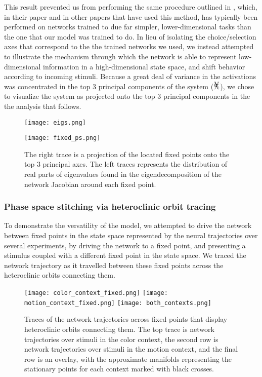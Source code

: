 \documentclass[12pt,a4paper,final]{iopart}
\begin{document}
This result prevented us from performing the same procedure outlined in \cite{BarakSussillo}, which, in their paper and in other papers that have used this method, has typically been performed on networks trained to due far simpler, lower-dimensional tasks than the one that our model was trained to do. In lieu of isolating the choice/selection axes that correspond to the the trained networks we used, we instead attempted to illustrate the mechanism through which the network is able to represent low-dimensional information in a high-dimensional state space, and shift behavior according to incoming stimuli. Because a great deal of variance in the activations was concentrated in the top $3$ principal components of the system ($\mathaccent89\%$), we chose to visualize the system as projected onto the top $3$ principal components in the the analysis that follows.

\begin{figure}
    \centering
    \begin{minipage}{0.49\linewidth}
        \centering
        \texttt{[image: eigs.png]}
    \end{minipage}
    \begin{minipage}{0.49\linewidth}
        \centering
        \texttt{[image: fixed\_ps.png]}
    \end{minipage}
    \caption{The right trace is a projection of the located fixed points onto the top $3$ principal axes. The left traces represents the distribution of real parts of eigenvalues found in the eigendecomposition of the network Jacobian around each fixed point.}
    \label{fig:my_label}
\end{figure}

\subsubsection{Phase space stitching via heteroclinic orbit tracing}
To demonstrate the versatility of the model, we attempted to drive the network between fixed points in the state space represented by the neural trajectories over several experiments, by driving the network to a fixed point, and presenting a stimulus coupled with a different fixed point in the state space. We traced the network trajectory as it travelled between these fixed points across the heteroclinic orbits connecting them.

\begin{figure}
    \centering
    \texttt{[image: color\_context\_fixed.png]}
    \texttt{[image: motion\_context\_fixed.png]}
    \texttt{[image: both\_contexts.png]}
    \caption{Traces of the network trajectories across fixed points that display heteroclinic orbits connecting them. The top trace is network trajectories over stimuli in the color context, the second row is network trajectories over stimuli in the motion context, and the final row is an overlay, with the approximate manifolds representing the stationary points for each context marked with black crosses.}
    \label{fig:my_label}
\end{figure}
\end{document}
